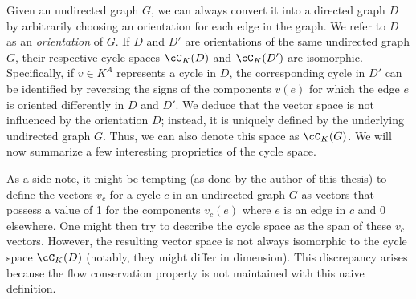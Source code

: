 \documentclass[11pt,a4paper,oneside,openany]{book}
\numberwithin{definition}{section}
\numberwithin{theorem}{section}
\numberwithin{problem}{section}
\begin{document}
Given an undirected graph \( G \), we can always convert it into a directed graph \( D \) by arbitrarily choosing an orientation for each edge in the graph. We refer to \( D \) as an \emph{orientation} of \( G \). If \( D \) and \( D' \) are orientations of the same undirected graph \( G \), their respective cycle spaces \( \cC_K(D) \) and \( \cC_K(D') \) are isomorphic. Specifically, if \( v \in K^A \) represents a cycle in \( D \), the corresponding cycle in \( D' \) can be identified by reversing the signs of the components \( v(e) \) for which the edge \( e \) is oriented differently in \( D \) and \( D' \). We deduce that the vector space is not influenced by the orientation \( D \); instead, it is uniquely defined by the underlying undirected graph \( G \). Thus, we can also denote this space as \( \cC_K(G) \). We will now summarize a few interesting proprieties of the cycle space.

As a side note, it might be tempting (as done by the author of this thesis) to define the vectors \( v_c \) for a cycle \( c \) in an undirected graph \( G \) as vectors that possess a value of 1 for the components \( v_c(e) \) where \( e \) is an edge in \( c \) and 0 elsewhere. One might then try to describe the cycle space as the span of these \( v_c \) vectors. However, the resulting vector space is not always isomorphic to the cycle space \( \cC_K(D) \) (notably, they might differ in dimension). This discrepancy arises because the flow conservation property is not maintained with this naive definition.
\end{document}
